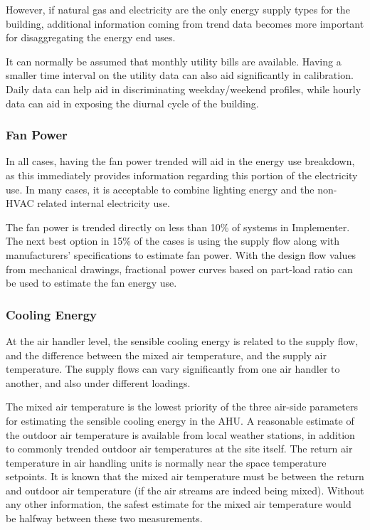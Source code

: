 However, if natural gas and electricity are the only energy supply types
for the building, additional information coming from trend data becomes
more important for disaggregating the energy end uses. 

It can normally be assumed that monthly utility bills are available.
Having a smaller time interval on the utility data can also aid
significantly in calibration. Daily data can help aid in
discriminating weekday/weekend profiles, while hourly data can aid in
exposing the diurnal cycle of the building. 


\subsubsection{Fan Power}

In all cases, having the fan power trended will aid in the energy use
breakdown, as this immediately provides information regarding this
portion of the electricity use.  In many cases, it is acceptable to
combine lighting energy and the non-HVAC related internal electricity
use. 

The fan power is trended directly on less than 10\% of systems in
Implementer. The next best option in 15\% of the cases is using the
supply flow along with manufacturers' specifications to estimate
fan power. With the design flow values from mechanical drawings,
fractional power curves based on part-load ratio can be used to estimate
the fan energy use. 



\subsubsection{Cooling Energy} 

At the air handler level, the sensible cooling energy is related to the
supply flow, and the difference between the mixed air temperature, and
the supply air temperature. The supply flows can vary significantly from
one air handler to another, and also under different loadings. 

The mixed air temperature is the lowest priority of the three air-side
parameters for estimating the sensible cooling energy in the AHU. A
reasonable estimate of the outdoor air temperature is available from
local weather stations, in addition to commonly trended outdoor air
temperatures at the site itself. The return air temperature in air
handling units is normally near the space temperature setpoints. It is
known that the mixed air temperature must be between the return and
outdoor air temperature (if the air streams are indeed being mixed).
Without any other information, the safest estimate for the mixed air
temperature would be halfway between these two measurements. 

